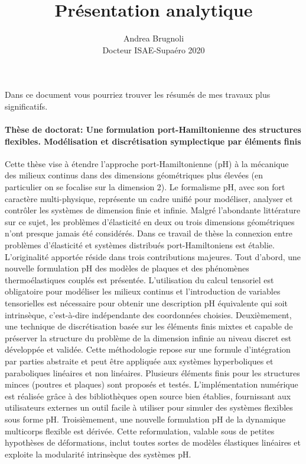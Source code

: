 \documentclass[french]{article}
\author{Andrea Brugnoli \\ 
	\hspace{2.8pt} Docteur ISAE-Supaéro 2020}
\title{Présentation analytique}
\date{}
\begin{document}
	
	\maketitle
	
Dans ce document vous pourriez trouver les résumés de mes travaux plus significatifs.

\paragraph{Thèse de doctorat: Une formulation port-Hamiltonienne des structures flexibles. Modélisation et discrétisation symplectique par éléments finis \cite{brugnoli2020phd}\\} 

Cette thèse vise à étendre l’approche port-Hamiltonienne (pH) à la mécanique des milieux continus dans des dimensions géométriques plus élevées (en particulier on se focalise sur la dimension 2). Le formalisme pH, avec son fort caractère multi-physique, représente un cadre unifié pour modéliser, analyser et contrôler les systèmes de dimension finie et infinie. Malgré l’abondante littérature sur ce sujet, les problèmes d’élasticité en deux ou trois dimensions géométriques n’ont presque jamais été considérés. Dans ce travail de thèse la connexion entre problèmes d’élasticité et systèmes distribués port-Hamiltoniens est établie. L’originalité apportée réside dans trois contributions majeures. Tout d’abord, une nouvelle formulation pH des modèles de plaques et des phénomènes thermoélastiques couplés est présentée. L’utilisation du calcul tensoriel est obligatoire pour modéliser les milieux continus et l’introduction de variables tensorielles est nécessaire pour obtenir une description pH équivalente qui soit intrinsèque, c’est-à-dire indépendante des coordonnées choisies. Deuxièmement, une technique de discrétisation basée sur les éléments finis mixtes et capable de préserver la structure du problème de la dimension infinie au niveau discret est développée et validée. Cette méthodologie repose sur une formule d’intégration par parties abstraite et peut être appliquée aux systèmes hyperboliques et paraboliques linéaires et non linéaires. Plusieurs éléments finis pour les structures minces (poutres et plaques) sont proposés et testés. L’implémentation numérique est réalisée grâce à des bibliothèques open source bien établies, fournissant aux utilisateurs externes un outil facile à utiliser pour simuler des systèmes flexibles sous forme pH. Troisièmement, une nouvelle formulation pH de la dynamique multicorps flexible est dérivée. Cette reformulation, valable sous de petites hypothèses de déformations, inclut toutes sortes de modèles élastiques linéaires
et exploite la modularité intrinsèque des systèmes pH.
\end{document}
